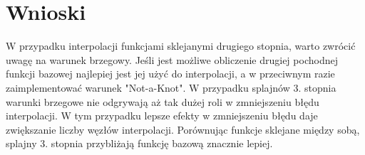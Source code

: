 \documentclass{article}
\begin{document}
\section{Wnioski}
W przypadku interpolacji funkcjami sklejanymi drugiego stopnia, warto zwrócić uwagę na warunek brzegowy. Jeśli jest możliwe obliczenie drugiej pochodnej
funkcji bazowej najlepiej jest jej użyć do interpolacji, a w przeciwnym razie zaimplementować warunek "Not-a-Knot". W przypadku splajnów 3. stopnia warunki brzegowe
nie odgrywają aż tak dużej roli w zmniejszeniu błędu interpolacji. W tym przypadku lepsze efekty w zmniejszeniu błędu daje zwiększanie liczby węzłów interpolacji.
Porównując funkcje sklejane między sobą, splajny 3. stopnia przybliżają funkcję bazową znacznie lepiej. 
\end{document}
